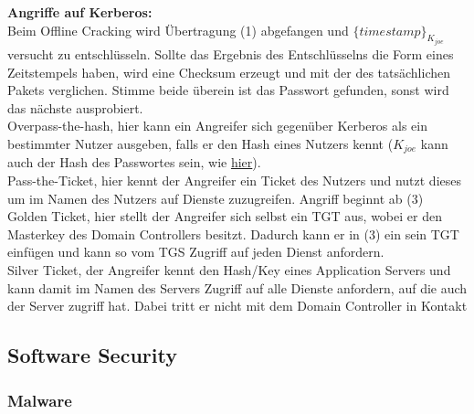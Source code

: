 \documentclass[a4paper,12pt,leqno]{article}
\begin{document}
\textbf{Angriffe auf Kerberos:}\\

Beim Offline Cracking wird Übertragung (1) abgefangen und $\{timestamp\}_{K_{joe}}$ versucht zu entschlüsseln. Sollte das Ergebnis des Entschlüsselns die Form eines Zeitstempels haben, wird eine Checksum erzeugt und mit der des tatsächlichen Pakets verglichen. Stimme beide überein ist das Passwort gefunden, sonst wird das nächste ausprobiert.\\

Overpass-the-hash, hier kann ein Angreifer sich gegenüber Kerberos als ein bestimmter Nutzer ausgeben, falls er den Hash eines Nutzers kennt ($K_{joe}$ kann auch der Hash des Passwortes sein, wie \hyperref[figure:CHAP]{hier}).\\

Pass-the-Ticket, hier kennt der Angreifer ein Ticket des Nutzers und nutzt dieses um im Namen des Nutzers auf Dienste zuzugreifen. Angriff beginnt ab (3)\\

Golden Ticket, hier stellt der Angreifer sich selbst ein TGT aus, wobei er den Masterkey des Domain Controllers besitzt. Dadurch kann er in (3) ein sein TGT einfügen und kann so vom TGS Zugriff auf jeden Dienst anfordern.\\

Silver Ticket, der Angreifer kennt den Hash/Key eines Application Servers und kann damit im Namen des Servers Zugriff auf alle Dienste anfordern, auf die auch der Server zugriff hat.
Dabei tritt er nicht mit dem Domain Controller in Kontakt

\subsection{Software Security}

\subsubsection{Malware}
\end{document}
